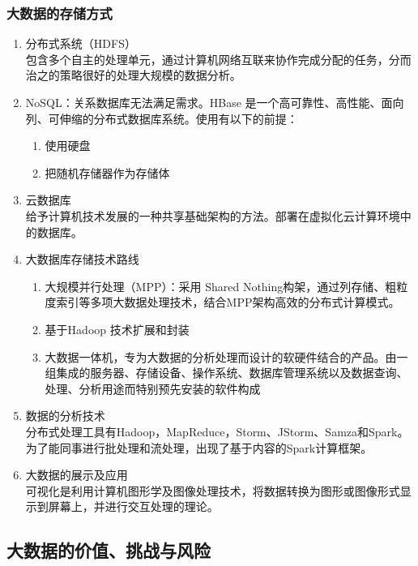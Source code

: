 \documentclass{article}
\begin{document}
\subsubsection{大数据的存储方式}
\begin{enumerate}
    \item 分布式系统（HDFS）\\
          \qquad 包含多个自主的处理单元，通过计算机网络互联来协作完成分配的任务，分而治之的策略很好的处理大规模的数据分析。
    \item NoSQL：关系数据库无法满足需求。HBase 是一个高可靠性、高性能、面向列、可伸缩的分布式数据库系统。使用有以下的前提：
          \begin{enumerate}
              \item 使用硬盘
              \item 把随机存储器作为存储体
          \end{enumerate}
    \item 云数据库 \\
          \qquad 给予计算机技术发展的一种共享基础架构的方法。部署在虚拟化云计算环境中的数据库。
    \item 大数据库存储技术路线
          \begin{enumerate}
              \item 大规模并行处理（MPP）：采用 Shared Nothing构架，通过列存储、粗粒度索引等多项大数据处理技术，结合MPP架构高效的分布式计算模式。
              \item 基于Hadoop 技术扩展和封装
              \item 大数据一体机，专为大数据的分析处理而设计的软硬件结合的产品。由一组集成的服务器、存储设备、操作系统、数据库管理系统以及数据查询、处理、分析用途而特别预先安装的软件构成
          \end{enumerate}
    \item 数据的分析技术 \\
          \qquad 分布式处理工具有Hadoop，MapReduce，Storm、JStorm、Samza和Spark。为了能同事进行批处理和流处理，出现了基于内容的Spark计算框架。
    \item 大数据的展示及应用 \\
          \qquad 可视化是利用计算机图形学及图像处理技术，将数据转换为图形或图像形式显示到屏幕上，并进行交互处理的理论。
\end{enumerate}
\subsection{大数据的价值、挑战与风险}
\end{document}

